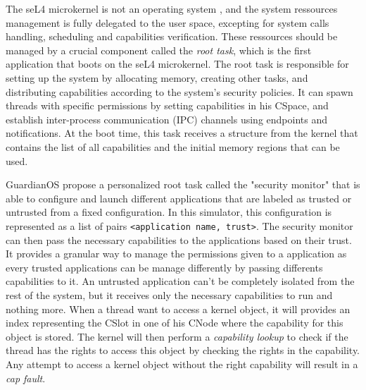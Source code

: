 \documentclass[conference]{IEEEtran}
\begin{document}
The seL4 microkernel is not an operating system \cite{heiser_sel4_nodate}, and the system ressources management is fully delegated to the user space, excepting for system calls handling, scheduling and capabilities verification. These ressources should be managed by a crucial component called the \textit{root task}, which is the first application that boots on the seL4 microkernel. The root task is responsible for setting up the system by allocating memory, creating other tasks, and distributing capabilities according to the system's security policies. It can spawn threads with specific permissions by setting capabilities in his CSpace, and establish inter-process communication (IPC) channels using endpoints and notifications. At the boot time, this task receives a structure from the kernel that contains the list of all capabilities and the initial memory regions that can be used. 

GuardianOS propose a personalized root task called the "security monitor" that is able to configure and launch different applications that are labeled as trusted or untrusted from a fixed configuration. In this simulator, this configuration is represented as a list of pairs \texttt{<application name, trust>}. The security monitor can then pass the necessary capabilities to the applications based on their trust. It provides a granular way to manage the permissions given to a application as every trusted applications can be manage differently by passing differents capabilities to it. An untrusted application can't be completely isolated from the rest of the system, but it receives only the necessary capabilities to run and nothing more. When a thread want to access a kernel object, it will provides an index representing the CSlot in one of his CNode where the capability for this object is stored. The kernel will then perform a \textit{capability lookup} to check if the thread has the rights to access this object by checking the rights in the capability. Any attempt to access a kernel object without the right capability will result in a \textit{cap fault}. 
\end{document}
